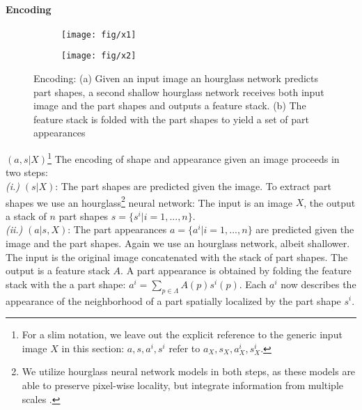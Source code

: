 \paragraph{Encoding}
\begin{figure}[!h]
\begin{subfigure}{0.5\textwidth}
\centering
\texttt{[image: fig/x1]}\caption{}
\label{fig:x1}
\end{subfigure}
\hspace{2cm}
\begin{subfigure}{0.5\textwidth}
\centering
\texttt{[image: fig/x2]}\caption{}
\label{fig:x2}
\end{subfigure}
\caption{ \small{Encoding: (a) Given an input image an hourglass network predicts part shapes, a second shallow hourglass network receives both input image and the part shapes and outputs a feature stack.
(b) The feature stack is folded with the part shapes to yield a set of part appearances}}
\label{fig:encoding}
\end{figure}
 ${(a, s | X)}$\footnote{ For a slim notation, we leave out the explicit reference to the generic input image $X$ in this section: $a, s, a^i, s^i$ refer to $a_X, s_X, a^i_X, s^i_X$.} The encoding of shape and appearance given an image proceeds in two steps: \\
\emph{(i.)} $(s|X)$: The part shapes are predicted given the image. To extract part shapes we use an hourglass\footnote{ We utilize hourglass neural network models in both steps, as these models are able to preserve pixel-wise locality, but integrate information from multiple scales \cite{hourglass}.}  neural network: The input is an image $X$, the output a stack of $n$ part shapes $s =  \{s^i| i=1, ...,  n\}$.\\ \emph{(ii.)} $(a|s,X)$: The part appearances $a =  \{a^i| i=1, ...,  n\}$ are predicted given the image and the part shapes. Again we use an hourglass network, albeit shallower. The input is the original image concatenated with the stack of part shapes. The output is a feature stack $A$. A part appearance is obtained by folding the feature stack with the a part shape: $a^i = \sum_{p \in \Lambda} A(p) s^i(p) $. Each $a^i$ now describes the appearance of the neighborhood of a part spatially localized by the part shape $s^i$.

